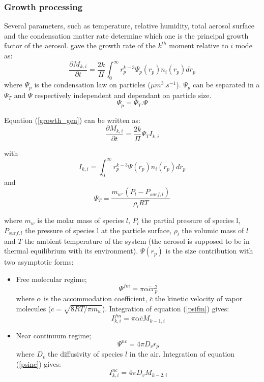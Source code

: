 \subsubsection*{Growth processing}
Several parameters, such as temperature, relative humidity, total aerosol surface and 
the condensation matter rate determine which one is the principal growth factor 
of the aerosol.  
\citet{Whitby1991} gave the growth rate of the $k^{th}$ moment relative to $i$ 
mode as:
\begin{equation}
\frac{\partial M_{k,i}}{\partial t} = \frac{2 k}{\Pi} \int_{0}^{\infty} r_p^{k-
3} \Psi_p(r_p)n_i(r_p) dr_p
\label{growth_gen}
\end{equation}
where $\Psi_p$ is the condensation law on particles ($\mu m^3.s^{-1}$). $\Psi_p$ 
can be separated in a $\Psi_T$ and $\Psi$ respectively independent and dependant 
on particle size.
\begin{equation}
\Psi_p = \Psi_T . \Psi
\label{psi}
\end{equation}

Equation (\ref{growth_gen}) can be written as:
\begin{equation}
\frac{\partial M_{k,i}}{\partial t} = \frac{2 k}{\Pi} \Psi_T I_{k,i}
\label{growth_sec}
\end{equation}

with 
\begin{equation}
I_{k,i} = \int_{0}^{\infty} r_p^{k-3} \Psi(r_p) n_i(r_p) dr_p
\label{ik}
\end{equation}
and 
\begin{equation}
\Psi_T = \frac{m_w . (P_l - P_{surf,l})}{\rho_l R T}
\label{psit}
\end{equation}

where $m_w$ is the molar mass of species $l$, $P_l$ the partial pressure of 
species l, $P_{surf,l}$ the pressure of species l at the particle surface,  
$\rho_l$ the volumic mass of $l$ and $T$ the ambient temperature of 
the system (the aerosol is supposed to be in thermal equilibrium with its 
environment).
$\Psi(r_p)$ is the size contribution with two asymptotic forms:
\begin{itemize}
\item Free molecular regime;
\begin{equation}
\Psi^{fm} = \pi \alpha \overline{c} r_p^2
\label{psifm}
\end{equation}
where $\alpha$ is the accommodation coefficient, $\overline{c}$ the kinetic 
velocity of vapor molecules ($\overline{c} = \sqrt{8 RT/\pi m_w}$).
Integration of equation (\ref{psifm}) gives:
\begin{equation}
I^{fm}_{k,i} = \pi \alpha \overline{c} M_{k-1,i}
\label{psifmint}
\end{equation}
\item Near continuum regime;
\begin{equation}
\Psi^{nc} = 4 \pi D_v r_p
\label{psinc}
\end{equation}
where $D_v$ the diffusivity of species $l$ in the air.
Integration of equation (\ref{psinc}) gives:
\begin{equation}
I^{nc}_{k,i} = 4 \pi D_v M_{k-2,i}
\label{psincint}
\end{equation}
\end{itemize}

